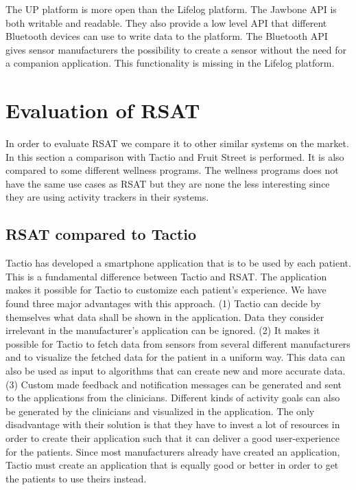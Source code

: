 \documentclass{cslthse-msc}
\begin{document}
The UP platform is more open than the Lifelog platform. The Jawbone API is both writable and readable. They also provide a low level API that different Bluetooth devices can use to write data to the platform. The Bluetooth API gives sensor manufacturers the possibility to create a sensor without the need for a companion application. This functionality is missing in the Lifelog platform.   


\section{Evaluation of RSAT}

In order to evaluate RSAT we compare it to other similar systems on the market. In this section a comparison with Tactio and Fruit Street is performed. It is also compared to some different wellness programs. The wellness programs does not have the same use cases as RSAT but they are none the less interesting since they are using activity trackers in their systems.

\subsection{RSAT compared to Tactio}

Tactio has developed a smartphone application that is to be used by each patient. This is a fundamental difference between Tactio and RSAT. The application makes it possible for Tactio to customize each patient’s experience. We have found three major advantages with this approach. (1) Tactio can decide by themselves what data 
shall be shown in the application. Data they consider irrelevant in the manufacturer’s application can be ignored. (2) It makes it possible for Tactio to fetch data from sensors from several different manufacturers and to visualize the fetched data for the patient in a uniform way. This data can also be used as input to algorithms that can create new and more accurate data. (3) Custom made feedback and notification messages can be generated and sent to the applications from the clinicians. Different kinds of activity goals can also be generated by the clinicians and visualized in the application. The only disadvantage with their solution is that they have to invest a lot of resources in order to create their application such that it can deliver a good user-experience for the patients. Since most manufacturers already have created an application, Tactio must create an application that is equally good or better in order to get the patients to use theirs instead. 
\end{document}
